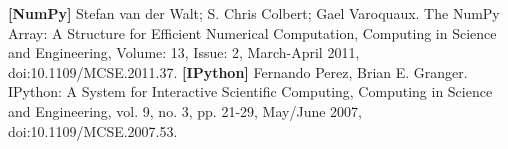 \documentclass[conference]{IEEEtran}
\begin{document}
\begin{thebibliography}{00}
\textbf{[NumPy]} Stefan van der Walt; S. Chris Colbert; Gael Varoquaux.
    The NumPy Array: A Structure for Efficient Numerical Computation, Computing in Science and Engineering,
    Volume: 13, Issue: 2, March-April 2011, doi:10.1109/MCSE.2011.37.
 \textbf{[IPython]} Fernando Perez, Brian E. Granger.
    IPython: A System for Interactive Scientific
    Computing, Computing in Science and Engineering,
    vol. 9, no. 3, pp. 21-29, May/June
    2007, doi:10.1109/MCSE.2007.53.
\end{thebibliography}
\end{document}
